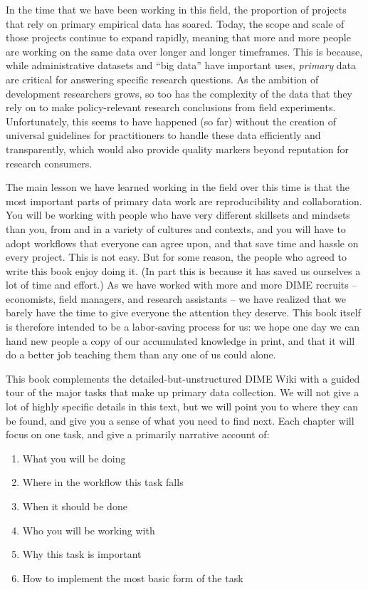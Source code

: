In the time that we have been working in this field,
the proportion of projects that rely on primary empirical data has soared. \cite{angrist2017economic}
Today, the scope and scale of those projects continue to expand rapidly,
meaning that more and more people are working on the same data over longer and longer timeframes.
This is because, while administrative datasets and ``big data'' have important uses,
\textit{primary} data are critical for answering specific research questions.
As the ambition of development researchers grows, so too has the complexity of the data
that they rely on to make policy-relevant research conclusions from field experiments.
Unfortunately, this seems to have happened (so far) without the creation of
universal guidelines for practitioners to handle these data efficiently and transparently,
which would also provide quality markers beyond reputation for research consumers.

The main lesson we have learned working in the field over this time is that
the most important parts of primary data work are reproducibility and collaboration.
You will be working with people who have very different skillsets and mindsets than you,
from and in a variety of cultures and contexts, and you will have to adopt workflows
that everyone can agree upon, and that save time and hassle on every project.
This is not easy. But for some reason, the people who agreed to write this book enjoy doing it.
(In part this is because it has saved us ourselves a lot of time and effort.)
As we have worked with more and more DIME recruits -- economists, field managers, and research assistants --
we have realized that we barely have the time to give everyone the attention they deserve.
This book itself is therefore intended to be a labor-saving process for us:
we hope one day we can hand new people a copy of our accumulated knowledge in print,
and that it will do a better job teaching them than any one of us could alone.

This book complements the detailed-but-unstructured DIME Wiki
with a guided tour of the major tasks that make up primary data collection.
We will not give a lot of highly specific details in this text,
but we will point you to where they can be found, and give you a sense of what you need to find next.
Each chapter will focus on one task, and give a primarily narrative account of:

\begin{enumerate}
  \item What you will be doing
  \item Where in the workflow this task falls
  \item When it should be done
  \item Who you will be working with
  \item Why this task is important
  \item How to implement the most basic form of the task
\end{enumerate}

